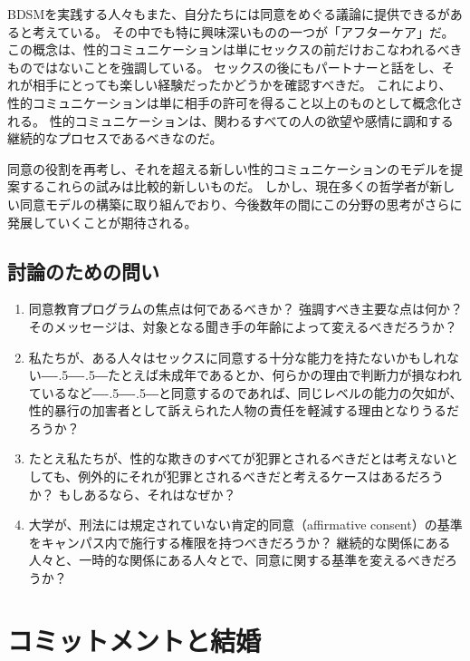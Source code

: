 \documentclass[paper=a4,book,openany]{jlreq}
\def\DDASH{―\kern-.5\zw―\kern-.5\zw―} %
\begin{document}
BDSMを実践する人々もまた、自分たちには同意をめぐる議論に提供できるがあると考えている。
その中でも特に興味深いものの一つが「アフターケア」だ。
この概念は、性的コミュニケーションは単にセックスの前だけおこなわれるべきものではないことを強調している。
セックスの後にもパートナーと話をし、それが相手にとっても楽しい経験だったかどうかを確認すべきだ。
これにより、性的コミュニケーションは単に相手の許可を得ること以上のものとして概念化される。
性的コミュニケーションは、関わるすべての人の欲望や感情に調和する継続的なプロセスであるべきなのだ。

同意の役割を再考し、それを超える新しい性的コミュニケーションのモデルを提案するこれらの試みは比較的新しいものだ。
しかし、現在多くの哲学者が新しい同意モデルの構築に取り組んでおり、今後数年の間にこの分野の思考がさらに発展していくことが期待される。

\section{討論のための問い}

\begin{enumerate}

\item 同意教育プログラムの焦点は何であるべきか？ 強調すべき主要な点は何か？ そのメッセージは、対象となる聞き手の年齢によって変えるべきだろうか？

\item  私たちが、ある人々はセックスに同意する十分な能力を持たないかもしれない{\DDASH}たとえば未成年であるとか、何らかの理由で判断力が損なわれているなど{\DDASH}と同意するのであれば、同じレベルの能力の欠如が、性的暴行の加害者として訴えられた人物の責任を軽減する理由となりうるだろうか？

\item  たとえ私たちが、性的な欺きのすべてが犯罪とされるべきだとは考えないとしても、例外的にそれが犯罪とされるべきだと考えるケースはあるだろうか？ もしあるなら、それはなぜか？

\item  大学が、刑法には規定されていない肯定的同意（affirmative consent）の基準をキャンパス内で施行する権限を持つべきだろうか？ 継続的な関係にある人々と、一時的な関係にある人々とで、同意に関する基準を変えるべきだろうか？
\end{enumerate}

\chapter{コミットメントと結婚}
\end{document}
